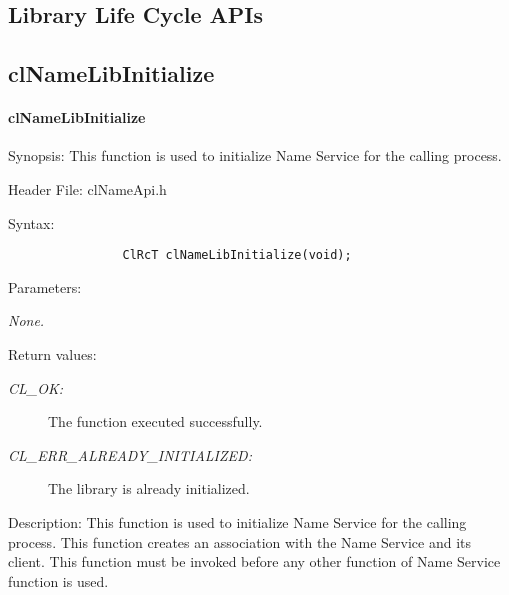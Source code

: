 \begin{flushleft}
\newpage


\section{Library Life Cycle APIs}
\subsection{clNameLibInitialize}
\hypertarget{pagens101}{}\paragraph{cl\-Name\-Lib\-Initialize}\label{pagens101}
\begin{Desc}
\item[Synopsis:]This function is used to initialize Name Service for the calling process.\end{Desc}
\begin{Desc}
\item[Header File:]clNameApi.h\end{Desc}
\begin{Desc}
\item[Syntax:]

\footnotesize\begin{verbatim}       
   				ClRcT clNameLibInitialize(void);
\end{verbatim}
\normalsize
\end{Desc}
\begin{Desc}
\item[Parameters:]
\begin{description}
\item[{\em None.}]\end{description}
\end{Desc}
\begin{Desc}
\item[Return values:]
\begin{description}
\item[{\em CL\_\-OK:}]The function executed successfully. 
\item[{\em CL\_\-ERR\_\-ALREADY\_\-INITIALIZED:}]The library is already initialized.
\end{description}
\end{Desc}
\begin{Desc}
\item[Description:]This function is used to initialize Name Service for the calling process. This function creates an association with the Name Service 
and its client. This function must be invoked before any other function of Name Service function is used. 


\end{Desc}
\end{flushleft}
